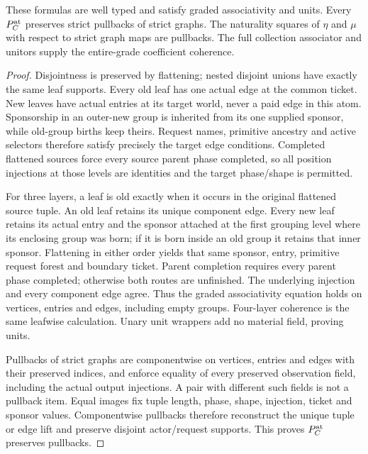 \documentclass[11pt]{article}
\begin{document}
\begin{theorem}
These formulas are well typed and satisfy graded associativity and units. Every $P_C^{\rm at}$ preserves strict pullbacks of strict graphs. The naturality squares of $\eta$ and $\mu$ with respect to strict graph maps are pullbacks. The full collection associator and unitors supply the entire-grade coefficient coherence.
\end{theorem}
\begin{proof}
Disjointness is preserved by flattening; nested disjoint unions have exactly the same leaf supports. Every old leaf has one actual edge at the common ticket. New leaves have actual entries at its target world, never a paid edge in this atom. Sponsorship in an outer-new group is inherited from its one supplied sponsor, while old-group births keep theirs. Request names, primitive ancestry and active selectors therefore satisfy precisely the target edge conditions. Completed flattened sources force every source parent phase completed, so all position injections at those levels are identities and the target phase/shape is permitted.

For three layers, a leaf is old exactly when it occurs in the original flattened source tuple. An old leaf retains its unique component edge. Every new leaf retains its actual entry and the sponsor attached at the first grouping level where its enclosing group was born; if it is born inside an old group it retains that inner sponsor. Flattening in either order yields that same sponsor, entry, primitive request forest and boundary ticket. Parent completion requires every parent phase completed; otherwise both routes are unfinished. The underlying injection and every component edge agree. Thus the graded associativity equation holds on vertices, entries and edges, including empty groups. Four-layer coherence is the same leafwise calculation. Unary unit wrappers add no material field, proving units.

Pullbacks of strict graphs are componentwise on vertices, entries and edges with their preserved indices, and enforce equality of every preserved observation field, including the actual output injections. A pair with different such fields is not a pullback item. Equal images fix tuple length, phase, shape, injection, ticket and sponsor values. Componentwise pullbacks therefore reconstruct the unique tuple or edge lift and preserve disjoint actor/request supports. This proves $P_C^{\rm at}$ preserves pullbacks.


\end{proof}
\end{document}
